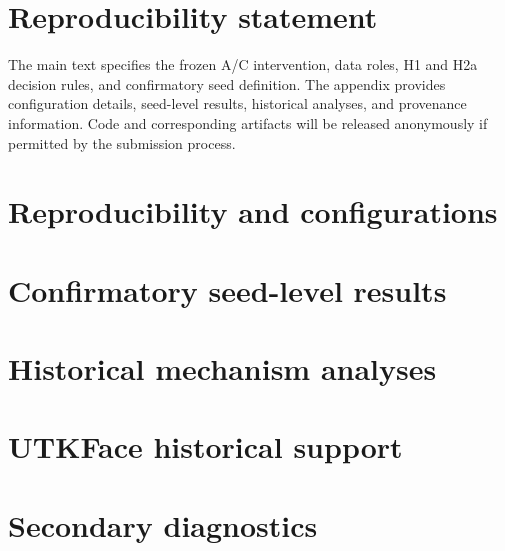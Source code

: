 \documentclass{article}
\begin{document}
\section*{Reproducibility statement}The main text specifies the frozen A/C intervention, data roles, H1 and H2a decision rules, and confirmatory seed definition. The appendix provides configuration details, seed-level results, historical analyses, and provenance information. Code and corresponding artifacts will be released anonymously if permitted by the submission process.

\clearpage\appendix
\section{Reproducibility and configurations}
\section{Confirmatory seed-level results}
\section{Historical mechanism analyses}
\section{UTKFace historical support}
\section{Secondary diagnostics}
\end{document}
